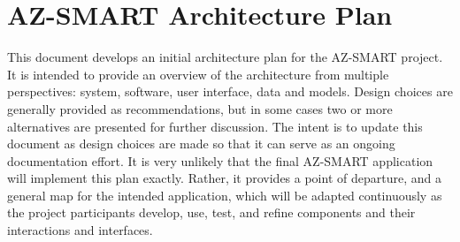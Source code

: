 \section{AZ-SMART Architecture Plan}
This document develops an initial architecture plan for the AZ-SMART project.  It is intended to provide an overview of the architecture from multiple perspectives: system, software, user interface, data and models.  Design choices are generally provided as recommendations, but in some cases two or more alternatives are presented for further discussion.  The intent is to update this document as design choices are made so that it can serve as an ongoing documentation effort.  It is very unlikely that the final AZ-SMART application will implement this plan exactly.  Rather, it provides a point of departure, and a general map for the intended application, which will be adapted continuously as the project participants develop, use, test, and refine components and their interactions and interfaces.
